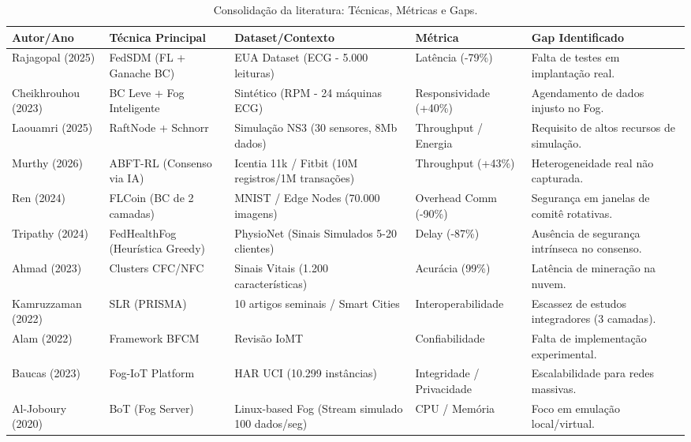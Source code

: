 \documentclass[12pt]{article}
\begin{document}
\begin{table}[h!]
    \centering
    \caption{Consolidação da literatura: Técnicas, Métricas e Gaps.}
    \label{tab:comparativa}
    \small
    \begin{tabular}{|p{2.5cm}|p{2.5cm}|p{2.8cm}|p{2.5cm}|p{2.5cm}|}
        \hline
        \textbf{Autor/Ano} & \textbf{Técnica Principal} & \textbf{Dataset/Contexto} & \textbf{Métrica} & \textbf{Gap Identificado} \\ \hline
        Rajagopal (2025) & FedSDM (FL + Ganache BC) & EUA Dataset (ECG - 5.000 leituras) & Latência (-79\%) & Falta de testes em implantação real. \\ \hline
        Cheikhrouhou (2023) & BC Leve + Fog Inteligente & Sintético (RPM - 24 máquinas ECG) & Responsividade (+40\%) & Agendamento de dados injusto no Fog. \\ \hline
        Laouamri (2025) & RaftNode + Schnorr & Simulação NS3 (30 sensores, 8Mb dados) & Throughput / Energia & Requisito de altos recursos de simulação. \\ \hline
        Murthy (2026) & ABFT-RL (Consenso via IA) & Icentia 11k / Fitbit (10M registros/1M transações)& Throughput (+43\%) & Heterogeneidade real não capturada. \\ \hline
        Ren (2024) & FLCoin (BC de 2 camadas) & MNIST / Edge Nodes (70.000 imagens) & Overhead Comm (-90\%) & Segurança em janelas de comitê rotativas. \\ \hline
        Tripathy (2024) & FedHealthFog (Heurística Greedy) & PhysioNet (Sinais Simulados 5-20 clientes) & Delay (-87\%) & Ausência de segurança intrínseca no consenso. \\ \hline
        Ahmad (2023) & Clusters CFC/NFC & Sinais Vitais (1.200 características) & Acurácia (99\%) & Latência de mineração na nuvem. \\ \hline
        Kamruzzaman (2022) & SLR (PRISMA) & 10 artigos seminais / Smart Cities & Interoperabilidade & Escassez de estudos integradores (3 camadas). \\ \hline
        Alam (2022) & Framework BFCM & Revisão IoMT & Confiabilidade & Falta de implementação experimental. \\ \hline
        Baucas (2023) & Fog-IoT Platform & HAR UCI (10.299 instâncias) & Integridade / Privacidade & Escalabilidade para redes massivas. \\ \hline
        Al-Joboury (2020) & BoT (Fog Server) & Linux-based Fog (Stream simulado 100 dados/seg) & CPU / Memória & Foco em emulação local/virtual. \\ \hline
    \end{tabular}
\end{table}
\end{document}
